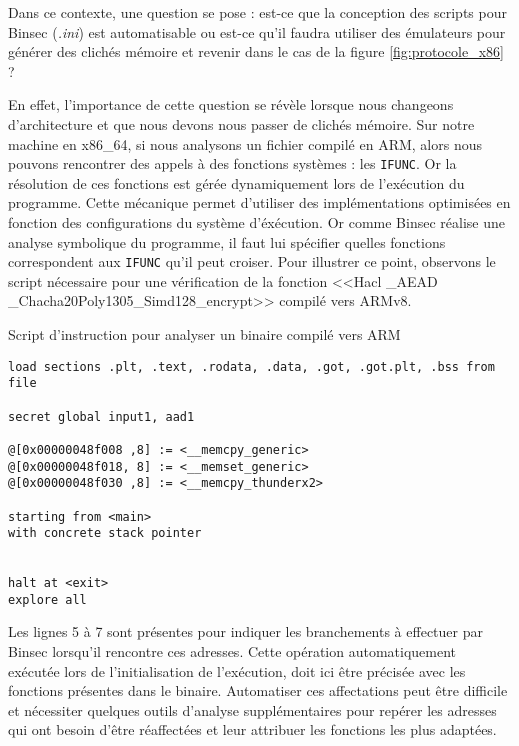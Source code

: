 Dans ce contexte, une question se pose : est-ce que la conception des scripts pour Binsec (\textit{.ini}) est automatisable ou est-ce qu'il faudra utiliser des émulateurs pour générer des clichés mémoire et revenir dans le cas de la figure \ref{fig:protocole_x86} ?\smallbreak

En effet, l'importance de cette question se révèle lorsque nous changeons d'architecture et que nous devons nous passer de clichés mémoire. Sur notre machine en x86\_64, si nous analysons un fichier compilé en ARM, alors nous pouvons rencontrer des appels à des fonctions systèmes : les \texttt{IFUNC}. Or la résolution de ces fonctions est gérée dynamiquement lors de l'exécution du programme. Cette mécanique permet d'utiliser des implémentations optimisées en fonction des configurations du système d'éxécution. Or comme Binsec réalise une analyse symbolique du programme, il faut lui spécifier quelles fonctions correspondent aux \texttt{IFUNC} qu'il peut croiser. Pour illustrer ce point, observons le script nécessaire pour une vérification de la fonction <<Hacl \_AEAD \_Chacha20Poly1305\_Simd128\_encrypt>> compilé vers ARMv8.

\begin{listing}[!ht]
    \caption{Script d'instruction pour analyser un binaire compilé vers ARM}
    \label{lst:script_arm_exemple}
    \begin{verbatim}
load sections .plt, .text, .rodata, .data, .got, .got.plt, .bss from file

secret global input1, aad1

@[0x00000048f008 ,8] := <__memcpy_generic>
@[0x00000048f018, 8] := <__memset_generic>
@[0x00000048f030 ,8] := <__memcpy_thunderx2>

starting from <main>
with concrete stack pointer


halt at <exit>
explore all 
    \end{verbatim}
\end{listing}

Les lignes 5 à 7 sont présentes pour indiquer les branchements à effectuer par Binsec lorsqu'il rencontre ces adresses. Cette opération automatiquement exécutée lors de l'initialisation de l'exécution, doit ici être précisée avec les fonctions présentes dans le binaire. Automatiser ces affectations peut être difficile et nécessiter quelques outils d'analyse supplémentaires pour repérer les adresses qui ont besoin d'être réaffectées et leur attribuer les fonctions les plus adaptées.\medbreak


